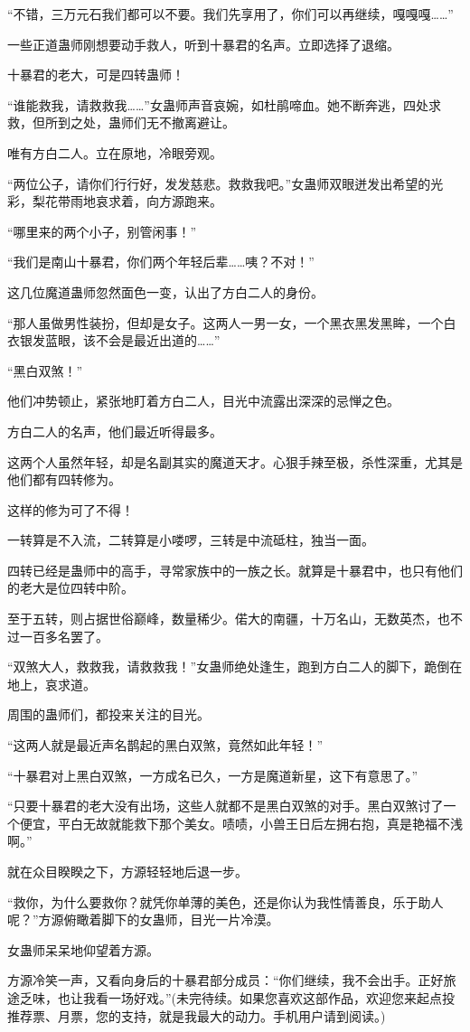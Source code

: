 \begin{this_body}
“不错，三万元石我们都可以不要。我们先享用了，你们可以再继续，嘎嘎嘎……”

一些正道蛊师刚想要动手救人，听到十暴君的名声。立即选择了退缩。

十暴君的老大，可是四转蛊师！

“谁能救我，请救救我……”女蛊师声音哀婉，如杜鹃啼血。她不断奔逃，四处求救，但所到之处，蛊师们无不撤离避让。

唯有方白二人。立在原地，冷眼旁观。

“两位公子，请你们行行好，发发慈悲。救救我吧。”女蛊师双眼迸发出希望的光彩，梨花带雨地哀求着，向方源跑来。

“哪里来的两个小子，别管闲事！”

“我们是南山十暴君，你们两个年轻后辈……咦？不对！”

这几位魔道蛊师忽然面色一变，认出了方白二人的身份。

“那人虽做男性装扮，但却是女子。这两人一男一女，一个黑衣黑发黑眸，一个白衣银发蓝眼，该不会是最近出道的……”

“黑白双煞！”

他们冲势顿止，紧张地盯着方白二人，目光中流露出深深的忌惮之色。

方白二人的名声，他们最近听得最多。

这两个人虽然年轻，却是名副其实的魔道天才。心狠手辣至极，杀性深重，尤其是他们都有四转修为。

这样的修为可了不得！

一转算是不入流，二转算是小喽啰，三转是中流砥柱，独当一面。

四转已经是蛊师中的高手，寻常家族中的一族之长。就算是十暴君中，也只有他们的老大是位四转中阶。

至于五转，则占据世俗巅峰，数量稀少。偌大的南疆，十万名山，无数英杰，也不过一百多名罢了。

“双煞大人，救救我，请救救我！”女蛊师绝处逢生，跑到方白二人的脚下，跪倒在地上，哀求道。

周围的蛊师们，都投来关注的目光。

“这两人就是最近声名鹊起的黑白双煞，竟然如此年轻！”

“十暴君对上黑白双煞，一方成名已久，一方是魔道新星，这下有意思了。”

“只要十暴君的老大没有出场，这些人就都不是黑白双煞的对手。黑白双煞讨了一个便宜，平白无故就能救下那个美女。啧啧，小兽王日后左拥右抱，真是艳福不浅啊。”

就在众目睽睽之下，方源轻轻地后退一步。

“救你，为什么要救你？就凭你单薄的美色，还是你认为我性情善良，乐于助人呢？”方源俯瞰着脚下的女蛊师，目光一片冷漠。

女蛊师呆呆地仰望着方源。

方源冷笑一声，又看向身后的十暴君部分成员：“你们继续，我不会出手。正好旅途乏味，也让我看一场好戏。”(未完待续。如果您喜欢这部作品，欢迎您来起点投推荐票、月票，您的支持，就是我最大的动力。手机用户请到阅读。)

\end{this_body}

